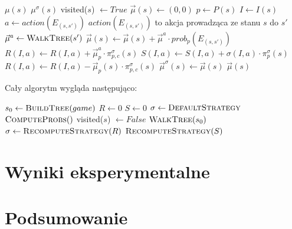 \documentclass[licencjacka]{pracamgr}
\begin{document}
\begin{algorithmic}
            \State \Return $\mu(s)$
        \EndIf
            \State \Return $\mu^{\sigma}(s)$
        \EndIf
        \State visited($s$) $\gets True$
        \State $\vec{\mu}(s) \gets (0, 0)$ 
        \State $p \gets P(s)$
        \State $I \gets I(s)$
            \State $a \gets action(E_{(s, s')})$
            \Comment $action(E_{(s, s')})$ to akcja prowadząca ze stanu $s$ do $s'$
            \State $\vec{\mu}^a \gets \Call{WalkTree}{s'}$
            \State $\vec{\mu}(s) \gets \vec{\mu}(s) + \vec{\mu}^a \cdot prob_p(E_{(s, s')})$
                \State $R(I, a) \gets R(I, a) + \vec{\mu}^a_p \cdot \pi_{p,c}^{\sigma}(s)$
                \State $S(I, a) \gets S(I, a) + \sigma(I, a) \cdot \pi_p^{\sigma}(s)$
            \EndIf
        \EndFor
            \State $R(I, a) \gets R(I, a) - \vec{\mu}_p(s) \cdot \pi_{p,c}^{\sigma}(s)$
        \EndIf
        \State $\vec{\mu}^{\sigma}(s) \gets \vec{\mu}(s)$
        \State \Return $\vec{\mu}(s)$
    \EndFunction
\end{algorithmic}

$\,$ \\

\noindent
Cały algorytm wygląda następująco: \\

\begin{algorithmic}
        \State $s_0\gets \Call{BuildTree}{game}$
        \State $R \gets 0$
        \State $S \gets 0$
        \State $\sigma \gets \Call{DefaultStrategy}{}$
            \State $\Call{ComputeProbs}{}()$
                \State visited($s$) $\gets False$
            \EndFor
            \State $\Call{WalkTree}{s_0}$
            \State $\sigma \gets \Call{RecomputeStrategy}{R}$
        \EndFor
        \State \Return $\Call{RecomputeStrategy}{S}$
    \EndFunction
\end{algorithmic}


\chapter{Wyniki eksperymentalne}

\chapter{Podsumowanie}

 
 
\end{document}
